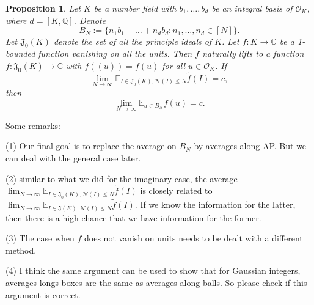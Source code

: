\documentclass[11pt]{amsart}
\newtheorem{proposition}[lemma]{Proposition}
\theoremstyle{definition}
\newcommand{\C}{{\mathbb C}}
\newcommand{\NN}{{\mathcal N}}
\newcommand{\Q}{{\mathbb Q}}
\begin{document}
\iffalse
\begin{proposition}
    Let $K$ be a number field with $b_{1},\dots,b_{d}$ be an integral basis of $\mathcal{O}_{K}$, where $d=[K,\Q]$. Denote 
    $$B_{N}:=\{n_{1}b_{1}+\dots+n_{d}b_{d}\colon n_{1},\dots,n_{d}\in[N]\}.$$
    Let $\mathfrak{J}_{0}(K)$ denote the set of all the principle ideals of $K$. Let $f\colon K\to\C$ be a 1-bounded function vanishing on all the units. Then $f$ naturally lifts to a function $\tilde{f}\colon \mathfrak{J}_{0}(K)\to\C$ with $\tilde{f}((u))=f(u)$ for all $u\in \mathcal{O}_{K}$. If 
    $$\lim_{N\to\infty}\mathbb{E}_{I\in\mathfrak{J}_{0}(K),\NN(I)\leq N}\tilde{f}(I)=c,$$
    then 
    $$\lim_{N\to\infty}\mathbb{E}_{u\in B_{N}}f(u)=c.$$
\end{proposition}

Some remarks: 

(1) Our final goal is to replace the average on $B_{N}$ by averages along AP. But we can deal with the general case later.

(2) similar to what we did for the imaginary case, the average $\lim_{N\to\infty}\mathbb{E}_{I\in\mathfrak{J}_{0}(K),\NN(I)\leq N}\tilde{f}(I)$ is closely related to $\lim_{N\to\infty}\mathbb{E}_{I\in\mathfrak{J}(K),\NN(I)\leq N}\tilde{f}(I)$. If we know the information for the latter, then there is a high chance that we have information for the former.

(3) The case when $f$ does not vanish on units needs to be dealt with a different method.

(4) I think the same argument can be used to show that for Gaussian integers, averages longs boxes are the same as averages along balls. So please check if this argument is correct.
\end{document}
